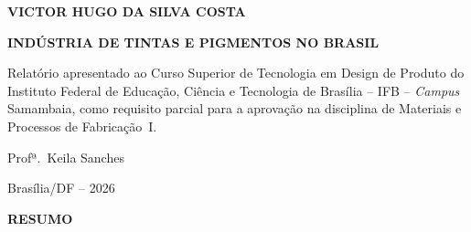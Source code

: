 \documentclass[
  12pt,
  a4paper,
  oneside,
  brazil,
  chapter=TITLE
]{article}
\begin{document}
\begin{titlepage}
  \thispagestyle{empty}
  \begin{center}

    {\normalsize\bfseries VICTOR HUGO DA SILVA COSTA}

    \vfill

    {\large\bfseries INDÚSTRIA DE TINTAS E PIGMENTOS NO BRASIL}

    \vfill

    \begin{flushright}
      \begin{minipage}{0.5\textwidth}
        \normalsize
        Relatório apresentado ao Curso Superior de Tecnologia em Design de
        Produto do Instituto Federal de Educação, Ciência e Tecnologia de
        Brasília -- IFB -- \textit{Campus} Samambaia, como requisito parcial
        para a aprovação na disciplina de Materiais e Processos de Fabricação~I.

        \vspace{1em}
        Profª.\ Keila Sanches
      \end{minipage}
    \end{flushright}

    \vfill

    {\normalsize Brasília/DF -- 2026}

  \end{center}
\end{titlepage}


\clearpage
\thispagestyle{empty}
\begin{center}
  {\normalsize\bfseries RESUMO}
\end{center}
\end{document}
